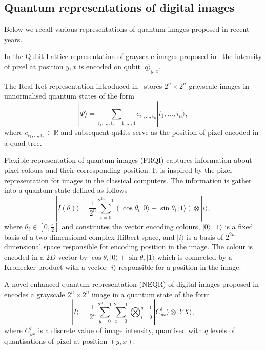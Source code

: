 \documentclass[a4paper,10pt]{llncs}
\newcommand{\ket}[1]{| #1 \rangle}
\newcommand{\1}{\mathbb{1}}
\begin{document}
\subsection{Quantum representations of digital images}
 Below we recall various representations of quantum
images proposed in recent years.

In the Qubit Lattice representation of grayscale images proposed in~\cite{venegas2003storing}
the intensity of pixel at position $y,x$ is encoded on qubit $\ket{q}_{y,x}$.

The Real Ket representation introduced in~\cite{latorre2005image} stores $2^n\times 2^n$
grayscale images in unnormalised quantum states of the form
$$
\ket{\Psi} = \sum_{i_1,\ldots, i_n=1,\ldots, 4} c_{i_1,\ldots, i_n}\ket{i_1,\ldots, i_n}, 
$$
where $c_{i_1,\ldots, i_n}\in \mathbb{R}$ and subsequent qu$4$its serve as the
position of pixel encoded in a quad-tree.

Flexible representation of quantum images (FRQI) captures information about 
pixel colours and their corresponding position. It is inspired by the pixel
representation for images in the classical computers. The information is gather 
into a quantum state defined as follows
\begin{equation}
| I(\theta)\rangle =
\frac{1}{2^n} \sum_{i=0}^{2^{2n} - 1}
( \cos \theta_i \, |0\rangle + \sin \theta_i \, |1\rangle ) \otimes |i\rangle,
\end{equation}
where $\theta_i \in \left[0 , \frac{\pi}{2} \right]$ and constitutes the vector
encoding colours, $|0 \rangle , |1\rangle$ is a fixed basis of a two dimensional
complex Hilbert space, and $| i \rangle$ is a basis of $2^{2 n}$ dimensional
space responsible for encoding position in the image. The colour is encoded in a
$2D$ vector by $\cos \theta_i \, |0\rangle + \sin \theta_i \, |1\rangle $ which
is connected by a Kronecker product with a vector  $| i \rangle$ responsible for
a position in the image.

A novel enhanced quantum representation (NEQR) of digital images proposed in
\cite{zhang2013neqr} encodes a grayscale $2^n \times 2^n$ image in a quantum
state of the form
$$
\ket{I} = \frac{1}{2^n} \sum\limits_{y=0}^{2^n-1} \sum\limits_{x=0}^{2^n-1} 
\bigotimes_{i=0}^{q-1} \ket{C^{i}_{yx}}\otimes\ket{YX},
$$
where $C^{i}_{yx}$ is a discrete value of image intensity, quantised with $q$
levels of quantisations of pixel at position $(y,x)$.
\end{document}
